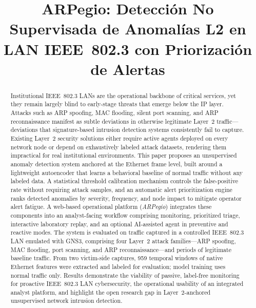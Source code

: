 \documentclass[conference]{IEEEtran}
\begin{document}
\title{ARPegio: Detección No Supervisada de Anomalías L2 en LAN
IEEE~802.3 con Priorización de Alertas}

\author{
}

\maketitle
\thispagestyle{plain}
\pagestyle{plain}

\begin{abstract}
Institutional IEEE~802.3 LANs are the operational backbone of critical
services, yet they remain largely blind to early-stage threats that
emerge below the IP layer. Attacks such as ARP spoofing, MAC flooding,
silent port scanning, and ARP reconnaissance manifest as subtle deviations
in otherwise legitimate Layer~2 traffic---deviations that
signature-based intrusion detection systems consistently fail to
capture. Existing Layer~2 security solutions either require active
agents deployed on every network node or depend on exhaustively labeled
attack datasets, rendering them impractical for real institutional
environments. This paper proposes an unsupervised anomaly detection
system anchored at the Ethernet frame level, built around a lightweight
autoencoder that learns a behavioral baseline of normal traffic without
any labeled data. A statistical threshold calibration mechanism controls
the false-positive rate without requiring attack samples, and an
automatic alert prioritization engine ranks detected anomalies by
severity, frequency, and node impact to mitigate operator alert fatigue.
A web-based operational platform (\textit{ARPegio}) integrates these
components into an analyst-facing workflow comprising monitoring,
prioritized triage, interactive laboratory replay, and an optional
AI-assisted agent in preventive and reactive modes.
The system is evaluated on traffic captured in a controlled IEEE~802.3
LAN emulated with GNS3, comprising four Layer~2 attack families---ARP
spoofing, MAC flooding, port scanning, and ARP reconnaissance---and
periods of legitimate baseline traffic. From two victim-side captures,
959 temporal windows of native Ethernet features were extracted and
labeled for evaluation; model training uses normal traffic only.
Results demonstrate the viability of passive, label-free monitoring for
proactive IEEE~802.3 LAN cybersecurity, the operational usability of an
integrated analyst platform, and highlight the open research gap in
Layer~2-anchored unsupervised network intrusion detection.
\end{abstract}
\end{document}

